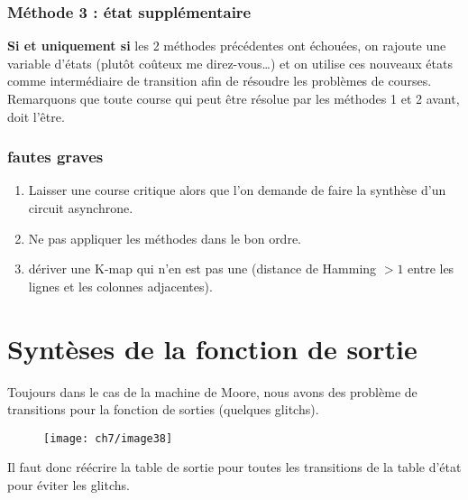 \subsubsection{Méthode 3 : état supplémentaire}
\textbf{Si et uniquement si} les 2 méthodes précédentes ont échouées, on rajoute une variable d'états (plutôt coûteux me direz-vous\dots) et on utilise ces nouveaux états comme intermédiaire de transition afin de résoudre les problèmes de courses.\\
Remarquons que toute course qui peut être résolue par les méthodes 1 et 2 avant, doit l'être.
\subsubsection{fautes graves}
\begin{enumerate}
	\item Laisser une course critique alors que l'on demande de faire la synthèse d'un circuit asynchrone.
	\item Ne pas appliquer les méthodes dans le bon ordre.
	\item dériver une K-map qui n'en est pas une (distance de Hamming $>1$ entre les lignes et les colonnes adjacentes).
\end{enumerate}
\section{Syntèses de la fonction de sortie}
\label{sec:synthfontsortie}
Toujours dans le cas de la machine de Moore, nous avons des problème de transitions pour la fonction de sorties (quelques glitchs).
\begin{figure}[H]
	\centering
	\texttt{[image: ch7/image38]}
\end{figure}
Il faut donc réécrire la table de sortie pour toutes les transitions de la table d'état pour éviter les glitchs.

